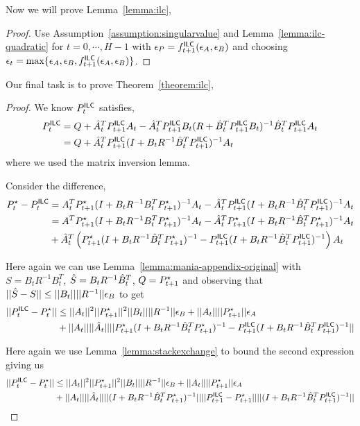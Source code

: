 Now we will prove Lemma~\ref{lemma:ilc},
\ilcLemma*
\begin{proof}
  Use Assumption~\ref{assumption:singularvalue} and
  Lemma~\ref{lemma:ilc-quadratic} for $t = 0, \cdots, H-1$ with
  $\epsilon_P = f^\mathsf{ILC}_{t+1}(\epsilon_A, \epsilon_B)$ and choosing $\epsilon_t =
  \max\{\epsilon_A, \epsilon_B, f^\mathsf{ILC}_{t+1}(\epsilon_A, \epsilon_B)\}$.
\end{proof}

Our final task is to prove Theorem~\ref{theorem:ilc},
\ilcTheorem*
\begin{proof}
  We know $P^\mathsf{ILC}_{t}$ satisfies,
\begin{align*}
  P^\mathsf{ILC}_{t} &= Q + \hat{A}_t^{T}P^\mathsf{ILC}_{{t+1}}A_t - \hat{A}_t^{T}P^\mathsf{ILC}_{t+1}B_t(R + \hat{B}_t^{T}P^\mathsf{ILC}_{{t+1}}B_t)^{-1}\hat{B}_t^{T}P^\mathsf{ILC}_{t+1}A_t \\
  &= Q + \hat{A}_t^{T}P^\mathsf{ILC}_{t+1}(I + B_tR^{-1}\hat{B}_t^{T}P^\mathsf{ILC}_{t+1})^{-1}A_t
\end{align*}
where we used the matrix inversion lemma.

Consider the difference,
\begin{align*}
  P^\star_{t} - P^\mathsf{ILC}_{t} &= A_t^{T}P^\star_{t+1}(I + B_tR^{-1}B_t^{T}P^\star_{t+1})^{-1}A_t - \hat{A}_t^{T}P^\mathsf{ILC}_{t+1}(I + B_tR^{-1}\hat{B}_t^{T}P^\mathsf{ILC}_{t+1})^{-1}A_t \\
                      &= A^{T}P^\star_{t+1}(I + B_tR^{-1}B_t^{T}P^\star_{t+1})^{-1}A_t - \hat{A}_t^{T}P^\star_{t+1}(I + B_tR^{-1}\hat{B}_t^{T}P^\star_{t+1})^{-1}A_t \\
  &+ \hat{A}_t^{T}\left(P^\star_{t+1}(I + B_tR^{-1}\hat{B}_t^{T}P^\star_{t+1})^{-1} - P^\mathsf{ILC}_{t+1}(I + B_tR^{-1}\hat{B}_t^{T}P^\mathsf{ILC}_{t+1})^{-1}\right)A_t
\end{align*}

Here again we can use Lemma~\ref{lemma:mania-appendix-original} with
$S = B_tR^{-1}B_t^{T}$, $\hat{S} = B_tR^{-1}\hat{B}_t^{T}$, $Q = P^\star_{t+1}$ and observing that
$||\hat{S} - S|| \leq ||B_t||||R^{-1}||\epsilon_B$ to get
\begin{align*}
  ||P^\mathsf{ILC}_{t} - P^\star_{t}|| &\leq ||A_t||^{2}||P^\star_{t+1}||^{2}||B_t||||R^{-1}||\epsilon_B + ||A_t||||P^\star_{t+1}||\epsilon_A \\
  &+ ||A_t||||\hat{A}_t||||P^\star_{t+1}(I + B_tR^{-1}\hat{B}_t^{T}P^\star_{t+1})^{-1} - P^\mathsf{ILC}_{t+1}(I + B_tR^{-1}\hat{B}_t^{T}P^\mathsf{ILC}_{t+1})^{-1}||
\end{align*}

Here again we use Lemma~\ref{lemma:stackexchange} to bound the second expression
giving us
\begin{align*}
  ||P^\mathsf{ILC}_{t} - P^\star_{t}|| &\leq ||A_t||^{2}||P^\star_{t+1}||^{2}||B_t||||R^{-1}||\epsilon_B + ||A_t||||P^\star_{t+1}||\epsilon_A \\
  &+ ||A_t||||\hat{A}_t|| ||(I + B_tR^{-1}\hat{B}_t^{T}P^\star_{t+1})^{-1}|| ||P^\mathsf{ILC}_{t+1} - P^\star_{t+1}|| ||(I + B_tR^{-1}\hat{B}_t^{T}P^\mathsf{ILC}_{t+1})^{-1}||
\end{align*}


\end{proof}
